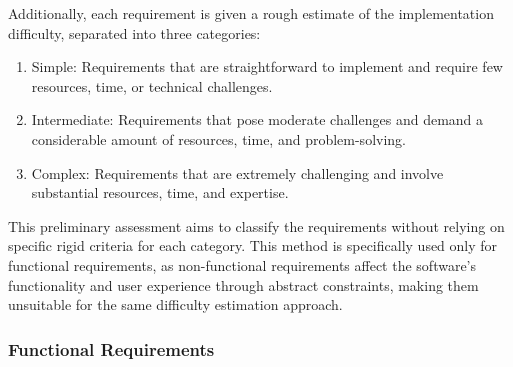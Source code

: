 Additionally, each requirement is given a rough estimate of the implementation difficulty, separated into three categories:
\begin{enumerate}
    \item Simple: Requirements that are straightforward to implement and require few resources, time, or technical challenges.
    \item Intermediate: Requirements that pose moderate challenges and demand a considerable amount of resources, time, and problem-solving.
    \item Complex: Requirements that are extremely challenging and involve substantial resources, time, and expertise.
\end{enumerate}
This preliminary assessment aims to classify the requirements without relying on specific rigid criteria for each category. This method is specifically used only for functional requirements, as non-functional requirements affect the software's functionality and user experience through abstract constraints, making them unsuitable for the same difficulty estimation approach.
\subsubsection{Functional Requirements}

